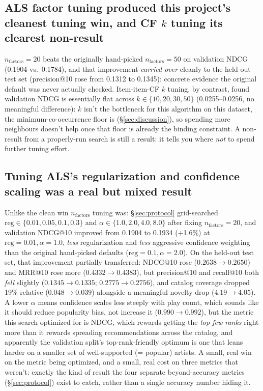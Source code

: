 \documentclass[11pt,a4paper]{article}
\newcommand{\secref}[1]{\S\ref{#1}}
\begin{document}
\subsection{ALS factor tuning produced this project's cleanest tuning win, and CF \texorpdfstring{$k$}{k} tuning its clearest non-result}

$n_{\text{factors}}=20$ beats the originally hand-picked $n_{\text{factors}}=50$ on validation NDCG (0.1904 vs.\ 0.1784), and that improvement \emph{carried over} cleanly to the held-out test set (precision@10 rose from 0.1312 to 0.1345): concrete evidence the original default was never actually checked. Item-item-CF $k$ tuning, by contrast, found validation NDCG is essentially flat across $k \in \{10,20,30,50\}$ (0.0255--0.0256, no meaningful difference): $k$ isn't the bottleneck for this algorithm on this dataset, the minimum-co-occurrence floor is (\secref{sec:discussion}), so spending more neighbours doesn't help once that floor is already the binding constraint. A non-result from a properly-run search is still a result: it tells you where \emph{not} to spend further tuning effort.

\subsection{Tuning ALS's regularization and confidence scaling was a real but mixed result}

Unlike the clean win $n_{\text{factors}}$ tuning was: \secref{sec:protocol} grid-searched $\text{reg} \in \{0.01,0.05,0.1,0.3\}$ and $\alpha \in \{1.0,2.0,4.0,8.0\}$ after fixing $n_{\text{factors}}=20$, and validation NDCG@10 improved from 0.1904 to 0.1934 (+1.6\%) at $\text{reg}=0.01, \alpha=1.0$, \emph{less} regularization and \emph{less} aggressive confidence weighting than the original hand-picked defaults ($\text{reg}=0.1, \alpha=2.0$). On the held-out test set, that improvement partially transferred: NDCG@10 rose ($0.2638 \to 0.2650$) and MRR@10 rose more ($0.4332 \to 0.4383$), but precision@10 and recall@10 both \emph{fell} slightly ($0.1345 \to 0.1335$; $0.2775 \to 0.2756$), and catalog coverage dropped 19\% relative ($0.048 \to 0.039$) alongside a meaningful novelty drop ($4.19 \to 4.05$). A lower $\alpha$ means confidence scales less steeply with play count, which sounds like it should reduce popularity bias, not increase it ($0.990 \to 0.992$), but the metric this search optimized for is NDCG, which rewards getting the \emph{top few ranks} right more than it rewards spreading recommendations across the catalog, and apparently the validation split's top-rank-friendly optimum is one that leans harder on a smaller set of well-supported (= popular) artists. A small, real win on the metric being optimized, and a small, real cost on three metrics that weren't: exactly the kind of result the four separate beyond-accuracy metrics (\secref{sec:protocol}) exist to catch, rather than a single accuracy number hiding it.
\end{document}
